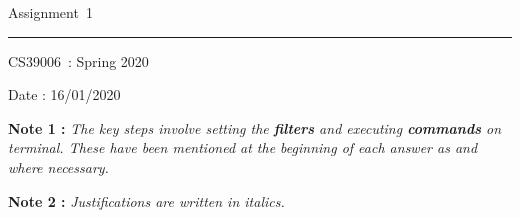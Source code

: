 \documentclass[fleqn]{article}
\newcommand{\myCourse}{CS39006}
\newcommand{\mySection}{Spring 2020}
\newcommand{\myAssignment}{Assignment~1}
\begin{document}
\title{\vspace{-1in}} %
\author{} %
\date{} %
\maketitle %

\usebox{\myTitleSignature}
\vspace{1in} %

{\centering \huge \myAssignment \par}
{\centering \noindent\rule{4in}{0.1pt} \par}
\vspace{0.05in}
{\centering \myCourse~: \mySection \par}
{\centering Date : 16/01/2020 \par}
\vspace{1in}

\tableofcontents
\vspace{170pt}
\textbf{Note 1 :}\textit{ The key steps involve setting the \textbf{filters} and executing \textbf{commands} on terminal. These have been mentioned at the beginning of each answer as and where necessary.} \par
\textbf{Note 2 :}\textit{ Justifications are written in italics.}
\newpage

\end{document}
